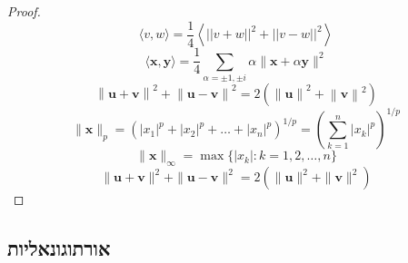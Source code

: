 \documentclass{tstextbook}
\begin{document}
\begin{proof}
$$\langle v,w \rangle = \frac{1}{4}\left\langle||v+w||^2 + ||v-w||^2\right\rangle$$$$\langle\mathbf{x},\mathbf{y}\rangle={\frac{1}{4}}\sum_{\alpha=\pm1,\pm i}\alpha\|\mathbf{x}+\alpha\mathbf{y}\|^{2}$$$$\left\|\mathbf{u}+\mathbf{v}\right\|^{2}+\left\|\mathbf{u}-\mathbf{v}\right\|^{2}=2(\left\|\mathbf{u}\right\|^{2}+\left\|\mathbf{v}\right\|^{2})$$$$\|\mathbf{x}\|_{p}=(|x_{1}|^{p}+|x_{2}|^{p}+\ldots+|x_{n}|^{p})^{1/p}=\left(\sum_{k=1}^{n}|x_{k}|^{p}\right)^{1/p}$$$$\|\mathbf{x}\|_{\infty}=\operatorname*{max}\{|x_{k}|:k=1,2,\ldots,n\}$$$$\|\mathbf{u}+\mathbf{v}\|^{2}+\|\mathbf{u}-\mathbf{v}\|^{2}=2(\|\mathbf{u}\|^{2}+\|\mathbf{v}\|^{2})$$

\end{proof}
\subsection{אורתוגונאליות}
\end{document}
